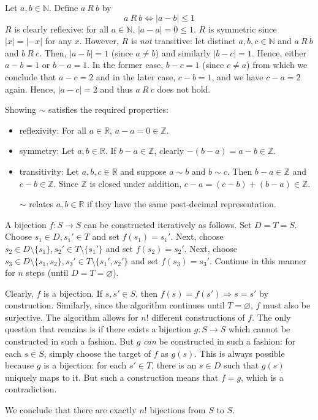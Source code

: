 \documentclass[a4paper]{report}
\newenvironment{ex}[1]
    {\noindent{\large \bf Exercise #1.}}{\vspace{0.5cm}}
\begin{document}
\begin{ex}{1.5}
 Let $a, b \in \mathbb{N}$. Define $a~R~b$ by
 \[
   a~R~b \Longleftrightarrow |a - b| \leq 1
  \]
  $R$ is clearly reflexive: for all $a \in \mathbb{N}$, $|a - a| = 0 \leq 1$. $R$ is symmetric since
  $|x| = |-x|$ for any $x$. However, $R$ is \emph{not} transitive: let distinct $a, b, c \in
  \mathbb{N}$ and $a~R~b$ and $b~R~c$. Then, $|a - b| = 1$ (since $a \neq b$) and similarly $|b - c| = 1$. Hence,
  either $a - b = 1$ or $b - a = 1$. In the former case, $b - c = 1$ (since $c \neq a$) from which we conclude
  that $a - c = 2$ and in the later case, $c - b = 1$, and we have $c - a = 2$ again. Hence, $|a - c| = 2$ and thus
  $a~R~c$ does not hold.
\end{ex}

\begin{ex}{1.6}
  Showing $\sim$ satisfies the required properties:
  \begin{itemize}
  \item reflexivity: For all $a \in \mathbb{R}$, $a -a = 0 \in \mathbb{Z}$.
  \item symmetry: Let $a, b \in \mathbb{R}$. If $b - a \in \mathbb{Z}$, clearly $-(b - a) = a - b \in \mathbb{Z}$.
  \item transitivity: Let $a, b, c \in \mathbb{R}$ and suppose $a \sim b$ and $b \sim c$. Then $b-a \in \mathbb{Z}$ and $c - b \in \mathbb{Z}$. Since 
    $\mathbb{Z}$ is closed under addition, $c - a = (c-b) + (b - a) \in \mathbb{Z}$.

    $\sim$ relates $a,b \in \mathbb{R}$ if they have the same post-decimal representation.
  \end{itemize}
\end{ex}
\begin{ex}{2.1}
  A bijection $f : S \rightarrow S$ can be constructed iteratively as
  follows. Set $D = T = S$.  Choose $s_1 \in D, s_1' \in T$ and set
  $f(s_1) = s_1'$. Next, choose $s_2 \in D \setminus \{s_1\}, s_2' \in
  T \setminus \{s_1'\}$ and set $f(s_2) = s_2'$.  Next, choose $s_3
  \in D \setminus \{s_1, s_2\}, s_3' \in T \setminus \{s_1',s_2'\}$
  and set $f(s_3) = s_3'$.  Continue in this manner for $n$ steps
  (until $D = T = \varnothing$).

  Clearly, $f$ is a bijection. If $s, s' \in S$, then $f(s) = f(s')
  \Rightarrow s = s'$ by construction.  Similarly, since the algorithm
  continues until $T = \varnothing$, $f$ must also be surjective.  The
  algorithm allows for $n!$ different constructions of $f$. The only
  question that remains is if there exists a bijection $g : S
  \rightarrow S$ which cannot be constructed in such a fashion.
  But $g$ \emph{can} be constructed in such a fashion: for each $s \in S$,
  simply choose the target of $f$ as $g(s)$. This is always possible
  because $g$ is a bijection: for each $s' \in T$, there is an
  $s \in D$ such that $g(s)$ uniquely maps to it. But such a construction
  means that $f = g$, which is a contradiction.

  We conclude that there are exactly $n!$ bijections from $S$ to $S$.
  
\end{ex}
\end{document}
